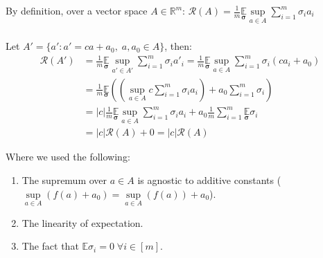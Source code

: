 By definition, over a vector space $A\in \mathbb{R}^m$:  
$\mathcal{R}(A) = \frac{1}{m} \underset{\pmb{\sigma}}{\mathbb{E}} \underset{a\in A}{\sup} \sum_{i=1}^m \sigma_i a_i$

\subsubsection{}
Let $A' = \{a': a' = ca + a_0, \; a, a_0 \in A\}$, then:
\begin{equation*}
    \begin{split}        
        \mathcal{R}(A') &= \frac{1}{m} \underset{\pmb{\sigma}}{\mathbb{E}} \underset{a'\in A'}{\sup} \sum_{i=1}^m \sigma_i a'_i 
        = \frac{1}{m} \underset{\pmb{\sigma}}{\mathbb{E}} \underset{a\in A}{\sup} \sum_{i=1}^m \sigma_i (ca_i + a_0) \\
        &= \frac{1}{m} \underset{\pmb{\sigma}}{\mathbb{E}} \left( \left(\underset{a\in A}{\sup} c \sum_{i=1}^m \sigma_i a_i\right) + a_0 \sum_{i=1}^m \sigma_i\right) \\
        &= |c| \frac{1}{m} \underset{\pmb{\sigma}}{\mathbb{E}} \underset{a\in A}{\sup} \sum_{i=1}^m \sigma_i a_i + a_0 \frac{1}{m} \sum_{i=1}^m \underset{\pmb{\sigma}}{\mathbb{E}} \sigma_i \\
        &= |c|\mathcal{R}(A) + 0 = |c|\mathcal{R}(A)
    \end{split}
\end{equation*}

Where we used the following:
\begin{enumerate}
    \item The supremum over $a\in A$ is agnostic to additive constants ($\underset{a\in A}{\sup} (f(a) + a_0) = \underset{a\in A}{\sup} (f(a)) + a_0$).
    \item The linearity of expectation.
    \item The fact that $\mathbb{E}\sigma_i = 0 \; \forall i\in [m]$.
\end{enumerate}

